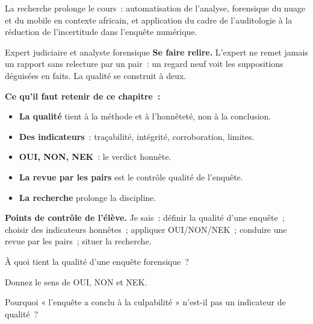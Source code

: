 La recherche prolonge le cours~: automatisation de l'analyse, forensique du
nuage et du mobile en contexte africain, et application du cadre de
l'auditologie à la réduction de l'incertitude dans l'enquête numérique.

\begin{boxmetier}{Expert judiciaire et analyste forensique}
\textbf{Se faire relire.} L'expert ne remet jamais un rapport sans relecture
par un pair~: un regard neuf voit les suppositions déguisées en faits. La
qualité se construit à deux.
\end{boxmetier}

\separateur

\begin{boxresume}
\textbf{Ce qu'il faut retenir de ce chapitre~:}
\begin{itemize}
    \item \textbf{La qualité} tient à la méthode et à l'honnêteté, non à la
          conclusion.
    \item \textbf{Des indicateurs}~: traçabilité, intégrité, corroboration,
          limites.
    \item \textbf{OUI, NON, NEK}~: le verdict honnête.
    \item \textbf{La revue par les pairs} est le contrôle qualité de
          l'enquête.
    \item \textbf{La recherche} prolonge la discipline.
\end{itemize}
\end{boxresume}

\begin{boxinfo}
\textbf{Points de contrôle de l'élève.} Je sais~: définir la qualité d'une
enquête~; choisir des indicateurs honnêtes~; appliquer OUI/NON/NEK~; conduire
une revue par les pairs~; situer la recherche.
\end{boxinfo}

\bigskip

\begin{boxexo}[title={\ding{45}\quad Exercice~20.1. Qualité \niveaubase}]
À quoi tient la qualité d'une enquête forensique~?
\end{boxexo}

\begin{boxexo}[title={\ding{45}\quad Exercice~20.2. Trois valeurs \niveaubase}]
Donnez le sens de OUI, NON et NEK.
\end{boxexo}

\begin{boxexo}[title={\ding{45}\quad Exercice~20.3. Trompeur \niveaubase}]
Pourquoi « l'enquête a conclu à la culpabilité » n'est-il pas un indicateur de
qualité~?
\end{boxexo}

